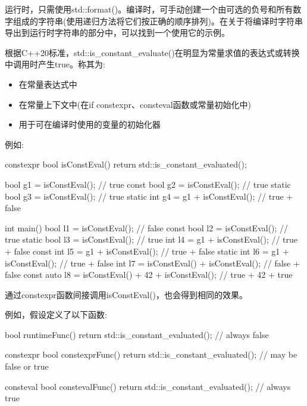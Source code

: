 运行时，只需使用std::format()。编译时，可手动创建一个由可选的负号和所有数字组成的字符串(使用递归方法将它们按正确的顺序排列)。在关于将编译时字符串导出到运行时字符串的部分中，可以找到一个使用它的示例。



根据C++20标准，std::is\_constant\_evaluate()在明显为常量求值的表达式或转换中调用时产生true。称其为:

\begin{itemize}
\item
在常量表达式中

\item
在常量上下文中(在if constexpr、consteval函数或常量初始化中)

\item
用于可在编译时使用的变量的初始化器
\end{itemize}

例如:

\begin{cpp}
constexpr bool isConstEval() {
	return std::is_constant_evaluated();
}

bool g1 = isConstEval(); // true
const bool g2 = isConstEval(); // true
static bool g3 = isConstEval(); // true
static int g4 = g1 + isConstEval(); // true + false

int main()
{
	bool l1 = isConstEval(); // false
	const bool l2 = isConstEval(); // true
	static bool l3 = isConstEval(); // true
	int l4 = g1 + isConstEval(); // true + false
	const int l5 = g1 + isConstEval(); // true + false
	static int l6 = g1 + isConstEval(); // true + false
	int l7 = isConstEval() + isConstEval(); // false + false
	const auto l8 = isConstEval() + 42 + isConstEval(); // true + 42 + true
}
\end{cpp}

通过constexpr函数间接调用isConstEval()，也会得到相同的效果。


例如，假设定义了以下函数:

\begin{cpp}
bool runtimeFunc() {
	return std::is_constant_evaluated(); // always false
}

constexpr bool constexprFunc() {
	return std::is_constant_evaluated(); // may be false or true
}

consteval bool constevalFunc() {
	return std::is_constant_evaluated(); // always true
}
\end{cpp}

